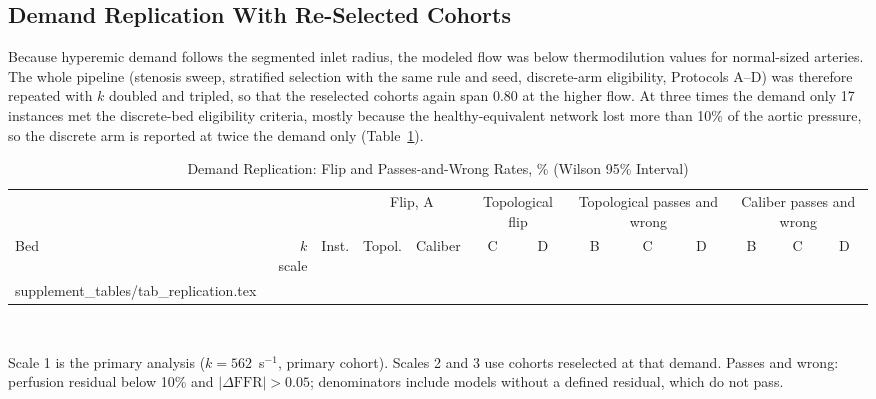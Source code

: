 \documentclass[journal,twoside,web,onecolumn]{ieeecolor}
\begin{document}
\subsection{Demand Replication With Re-Selected Cohorts}\label{sec:replication}
Because hyperemic demand follows the segmented inlet radius, the modeled flow was below thermodilution values for
normal-sized arteries. The whole pipeline (stenosis sweep, stratified selection with the same rule and seed,
discrete-arm eligibility, Protocols A--D) was therefore repeated with $k$ doubled and tripled, so that the reselected
cohorts again span 0.80 at the higher flow. At three times the demand only 17 instances met the discrete-bed
eligibility criteria, mostly because the healthy-equivalent network lost more than 10\% of the aortic pressure, so the
discrete arm is reported at twice the demand only (Table~\ref{tab:repl}).
\begin{table}[!ht]
\caption{Demand Replication: Flip and Passes-and-Wrong Rates, \% (Wilson 95\% Interval)}\label{tab:repl}
\centering\footnotesize\setlength{\tabcolsep}{3pt}
\begin{tabular}{@{}lrrcccccccccc@{}}
\toprule
 & & & \multicolumn{2}{c}{Flip, A} & \multicolumn{2}{c}{Topological flip} & \multicolumn{3}{c}{Topological passes and wrong} & \multicolumn{3}{c}{Caliber passes and wrong}\\
\cmidrule(lr){4-5}\cmidrule(lr){6-7}\cmidrule(lr){8-10}\cmidrule(l){11-13}
Bed & $k$ scale & Inst. & Topol. & Caliber & C & D & B & C & D & B & C & D\\
\midrule
{} supplement_tables/tab_replication.tex 
\bottomrule
\end{tabular}
\\[3pt]
\parbox{0.95\textwidth}{\footnotesize Scale 1 is the primary analysis ($k = 562$~s$^{-1}$, primary cohort). Scales 2 and 3 use
cohorts reselected at that demand. Passes and wrong: perfusion residual below 10\% and $|\Delta\mathrm{FFR}| > 0.05$;
denominators include models without a defined residual, which do not pass.}
\end{table}

\FloatBarrier
\end{document}
